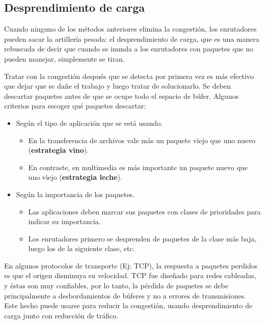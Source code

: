\subsection{Desprendimiento de carga}

	\par Cuando ninguno de los métodos anteriores elimina la congestión, los enrutadores pueden sacar la artillería pesada: el desprendimiento de carga, que es una manera rebuscada de decir que cuando se inunda a los enrutadores con paquetes que no pueden manejar, simplemente se tiran.

	\par Tratar con la congestión después que se detecta por primera vez es más efectivo que dejar que se dañe el trabajo y luego tratar de solucionarlo. Se deben descartar paquetes antes de que se ocupe todo el espacio de búfer. Algunos criterios para escoger qué paquetes descartar:
	
	\begin{itemize}
		\item Según el tipo de aplicación que se está usando.
			\begin{itemize}
				\item En la transferencia de archivos vale más un paquete viejo que uno nuevo (\textbf{estrategia vino}).
				\item En contraste, en multimedia es más importante un paquete nuevo que uno viejo (\textbf{estrategia leche}).
			\end{itemize}
		\item Según la importancia de los paquetes.
			\begin{itemize}
				\item  Las aplicaciones deben marcar sus paquetes con clases de prioridades para indicar su importancia.
				\item Los enrutadores primero se desprenden de paquetes de la clase más baja,
luego los de la siguiente clase, etc.
			\end{itemize}			 
	\end{itemize}

	\par En algunos protocolos de transporte (Ej: TCP), la respuesta a paquetes perdidos es que el origen disminuya su velocidad. TCP fue diseñado para redes cableadas, y éstas son muy confiables, por lo tanto, la pérdida de paquetes se debe principalmente a desbordamientos de búferes y no a errores de transmisiones. Este hecho puede usarse para reducir la congestión, usando desprendimiento de carga junto con reducción de tráfico.

